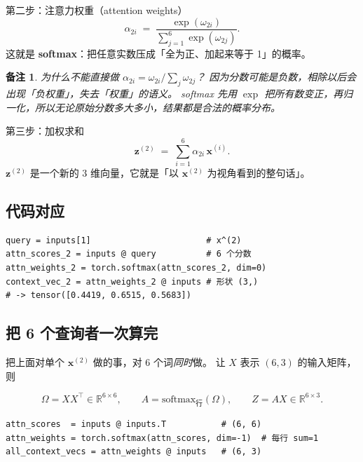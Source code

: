 \documentclass[11pt,a4paper]{ctexart}
\newtheorem{remark}[theorem]{备注}
\newcommand{\vect}[1]{\boldsymbol{#1}}
\begin{document}
\begin{mathbox}{第二步：注意力权重（attention weights）}
\[
  \alpha_{2i} \;=\; \frac{\exp(\omega_{2i})}{\sum_{j=1}^{6} \exp(\omega_{2j})}.
\]
这就是 \textbf{softmax}：把任意实数压成「全为正、加起来等于 1」的概率。
\end{mathbox}

\begin{remark}
为什么不能直接做 $\alpha_{2i} = \omega_{2i} / \sum_j \omega_{2j}$？
因为分数可能是负数，相除以后会出现「负权重」，失去「权重」的语义。
softmax 先用 $\exp$ 把所有数变正，再归一化，所以无论原始分数多大多小，结果都是合法的概率分布。
\end{remark}

\begin{mathbox}{第三步：加权求和}
\[
  \vect{z}^{(2)} \;=\; \sum_{i=1}^{6} \alpha_{2i}\, \vect{x}^{(i)}.
\]
$\vect{z}^{(2)}$ 是一个新的 3 维向量，它就是「以 $\vect{x}^{(2)}$ 为视角看到的整句话」。
\end{mathbox}

\subsection{代码对应}

\begin{codebox}
\begin{lstlisting}
query = inputs[1]                       # x^(2)
attn_scores_2 = inputs @ query          # 6 个分数
attn_weights_2 = torch.softmax(attn_scores_2, dim=0)
context_vec_2 = attn_weights_2 @ inputs # 形状 (3,)
# -> tensor([0.4419, 0.6515, 0.5683])
\end{lstlisting}
\end{codebox}

\subsection{把 6 个查询者一次算完}

把上面对单个 $\vect{x}^{(2)}$ 做的事，对 6 个词\emph{同时}做。
让 $X$ 表示 $(6, 3)$ 的输入矩阵，则

\[
  \Omega = X X^\top \in \mathbb{R}^{6\times 6}, \qquad
  A = \mathrm{softmax}_{\text{行}}(\Omega), \qquad
  Z = A X \in \mathbb{R}^{6\times 3}.
\]

\begin{codebox}
\begin{lstlisting}
attn_scores  = inputs @ inputs.T           # (6, 6)
attn_weights = torch.softmax(attn_scores, dim=-1)  # 每行 sum=1
all_context_vecs = attn_weights @ inputs   # (6, 3)
\end{lstlisting}
\end{codebox}
\end{document}
